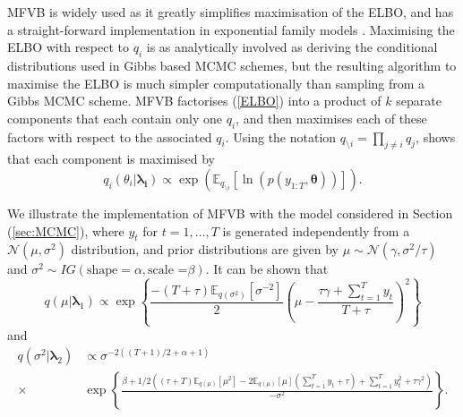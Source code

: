 \documentclass[12pt,a4paper]{article}%
\numberwithin{equation}{section}
\begin{document}
MFVB is widely used as it greatly simplifies maximisation of the ELBO, and has a straight-forward implementation in exponential family models \citep{Wainwright2008}.  Maximising the ELBO with respect to $q_i$ is as analytically involved as deriving the conditional distributions used in Gibbs based MCMC schemes, but the resulting algorithm to maximise the ELBO is much simpler computationally than sampling from a Gibbs MCMC scheme. MFVB factorises (\ref{ELBO}) into a product of $k$ separate components that each contain only one $q_i$, and then maximises each of these factors with respect to the associated $q_i$. Using the notation $q_{\setminus i} = \prod_{j\neq i}q_j$, \citet{Attias1999} shows that each component is maximised by
\begin{equation}
\label{mf2}
q_i(\theta_i |\boldsymbol{\lambda_i}) \propto\exp( \mathbb{E}_{q_{\setminus i}} [\ln(p(y_{1:T},\boldsymbol{\theta}))]).
\end{equation}

We illustrate the implementation of MFVB with the model considered in Section (\ref{sec:MCMC}), where $y_t$ for $t = 1, \dots, T$ is generated independently from a $\mathcal{N}(\mu, \sigma^2)$ distribution, and prior distributions are given by $\mu \sim \mathcal{N}(\gamma, \sigma^2 / \tau)$ and $\sigma^2 \sim IG(\mbox{shape} = \alpha, \mbox{scale =}\beta)$. It can be shown that
\begin{equation}
\label{mf3}
q(\mu | \boldsymbol{\lambda}_1) \propto \exp \left\{ \frac{-(T + \tau) \mathbb{E}_{q(\sigma^2)}[\sigma^{-2}]}{2} \left( \mu - \frac{\tau \gamma + \sum_{t=1}^{T} y_t}{T + \tau} \right)^2 \right\}
\end{equation}
and
\begin{align}
\label{mf4}
q(\sigma^2 | \boldsymbol{\lambda}_2) &\propto \sigma^{-2((T+1)/2 + \alpha + 1)} \nonumber \\
\times &\exp \left\{ \frac{ \beta + 1/2\left((\tau + T)\mathbb{E}_{q(\mu)}[\mu^2] - 2 \mathbb{E}_{q(\mu)}[\mu ]\left(\sum_{t=1}^{T}y_t + \tau \right) + \sum_{t=1}^{T} y_t^2 + \tau \gamma^2\right)}{-\sigma^2} \right\}.
\end{align}
\end{document}
